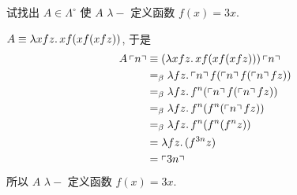 \begin{problem}
试找出 $A \in \Lambda^\circ$ 使 $A$ $\lambda-$ 定义函数 $f(x)=3x$.
\end{problem}

\begin{solution}
$A \equiv \lambda {xfz}.\,{xf(xf(xfz))}$, 于是
\begin{align*}
A \left\ulcorner n \right\urcorner & \equiv (\lambda {xfz}.\,{xf(xf(xfz))}) \left\ulcorner n \right\urcorner \\
& =_\beta \lambda {fz}.\,{\left\ulcorner n \right\urcorner f(\left\ulcorner n \right\urcorner f(\left\ulcorner n \right\urcorner fz))} \\
& =_\beta \lambda {fz}.\,{f^n(\left\ulcorner n \right\urcorner f(\left\ulcorner n \right\urcorner fz))} \\
& =_\beta \lambda {fz}.\,{f^n(f^n(\left\ulcorner n \right\urcorner fz))} \\
& =_\beta \lambda {fz}.\,{f^n(f^n(f^nz))} \\
& = \lambda {fz}.\,{(f^{3n} z)} \\
& = \left\ulcorner 3n \right\urcorner
\end{align*}
所以 $A$ $\lambda-$ 定义函数 $f(x)=3x$.
\end{solution}
